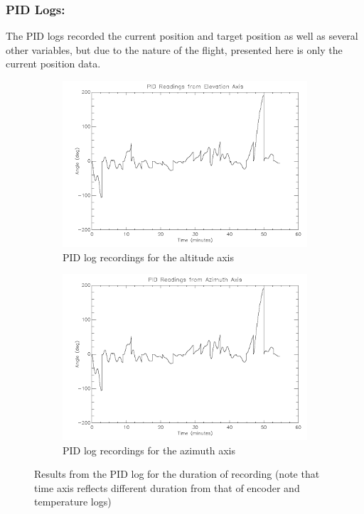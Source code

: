 \subsubsection*{PID Logs:}

The PID logs recorded the current position and target position as well as several other variables, but due to the nature of the flight, presented here is only the current position data. 

\begin{figure}[htbp]
\captionsetup[subfigure]{justification=centering}
\captionsetup{justification=centering}
    \centering
	\begin{subfigure}{0.45\textwidth}
		\includegraphics[width=1\linewidth]{appendix/img/campaign_results/pid_alt.png}
		\caption{PID log recordings for the altitude axis}
		\label{fig:sub:pidalt}
	\end{subfigure}
	\begin{subfigure}{0.45\textwidth}
		\includegraphics[width=1\linewidth]{appendix/img/campaign_results/pid_az.png}
		\caption{PID log recordings for the azimuth axis}
		\label{fig:sub:pidaz}
	\end{subfigure}
	\caption{Results from the PID log for the duration of recording (note that time axis reflects different duration from that of encoder and temperature logs)}
	\label{fig:PID}
\end{figure}

